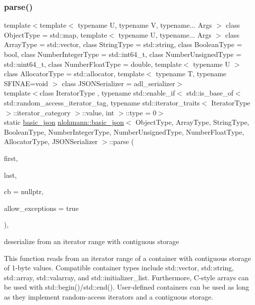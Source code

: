 \subsubsection{\texorpdfstring{parse()}{parse()}\hspace{0.1cm}{\footnotesize\ttfamily [3/3]}}
{\footnotesize\ttfamily template$<$template$<$ typename U, typename V, typename... Args $>$ class Object\+Type = std\+::map, template$<$ typename U, typename... Args $>$ class Array\+Type = std\+::vector, class String\+Type  = std\+::string, class Boolean\+Type  = bool, class Number\+Integer\+Type  = std\+::int64\+\_\+t, class Number\+Unsigned\+Type  = std\+::uint64\+\_\+t, class Number\+Float\+Type  = double, template$<$ typename U $>$ class Allocator\+Type = std\+::allocator, template$<$ typename T, typename S\+F\+I\+N\+A\+E=void $>$ class J\+S\+O\+N\+Serializer = adl\+\_\+serializer$>$ \\
template$<$class Iterator\+Type , typename std\+::enable\+\_\+if$<$ std\+::is\+\_\+base\+\_\+of$<$ std\+::random\+\_\+access\+\_\+iterator\+\_\+tag, typename std\+::iterator\+\_\+traits$<$ Iterator\+Type $>$\+::iterator\+\_\+category $>$\+::value, int $>$\+::type  = 0$>$ \\
static \mbox{\hyperlink{classnlohmann_1_1basic__json}{basic\+\_\+json}} \mbox{\hyperlink{classnlohmann_1_1basic__json}{nlohmann\+::basic\+\_\+json}}$<$ Object\+Type, Array\+Type, String\+Type, Boolean\+Type, Number\+Integer\+Type, Number\+Unsigned\+Type, Number\+Float\+Type, Allocator\+Type, J\+S\+O\+N\+Serializer $>$\+::parse (\begin{DoxyParamCaption}\item[{Iterator\+Type}]{first,  }\item[{Iterator\+Type}]{last,  }\item[{const \mbox{\hyperlink{classnlohmann_1_1basic__json_ab4f78c5f9fd25172eeec84482e03f5b7}{parser\+\_\+callback\+\_\+t}}}]{cb = {\ttfamily nullptr},  }\item[{const bool}]{allow\+\_\+exceptions = {\ttfamily true} }\end{DoxyParamCaption})\hspace{0.3cm}{\ttfamily [inline]}, {\ttfamily [static]}}



deserialize from an iterator range with contiguous storage 

This function reads from an iterator range of a container with contiguous storage of 1-\/byte values. Compatible container types include {\ttfamily std\+::vector}, {\ttfamily std\+::string}, {\ttfamily std\+::array}, {\ttfamily std\+::valarray}, and {\ttfamily std\+::initializer\+\_\+list}. Furthermore, C-\/style arrays can be used with {\ttfamily std\+::begin()}/{\ttfamily std\+::end()}. User-\/defined containers can be used as long as they implement random-\/access iterators and a contiguous storage.

